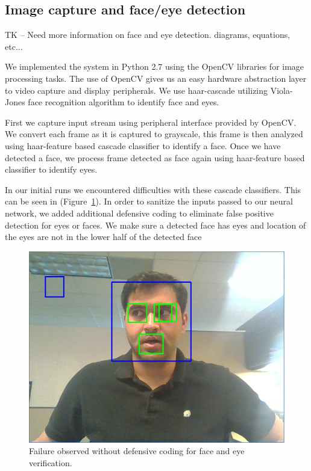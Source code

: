 \documentclass[10pt,twocolumn,letterpaper]{article}
\begin{document}
\subsection{Image capture and face/eye detection}
TK -- Need more information on face and eye detection. diagrams,
equations, etc...

We implemented the system in Python 2.7 using the OpenCV libraries for 
image processing tasks. The use of OpenCV gives us an easy hardware 
abstraction layer to video capture and display peripherals. We use 
haar-cascade utilizing Viola-Jones face recognition algorithm to 
identify face and eyes. 

First we capture input stream using peripheral
interface provided by OpenCV. We convert each 
frame as it is captured to grayscale, this frame is then analyzed 
using haar-feature based cascade classifier to identify a face. 
Once we have detected a face, we process frame detected 
as face again using haar-feature based classifier to identify eyes. 

In our initial runs we encountered difficulties with these cascade classifiers.
This can be seen in  (Figure~\ref{fig:defensive}).
In order to sanitize the inputs passed to our neural network, we added 
additional defensive coding to eliminate false positive detection 
for eyes or faces. We make sure a detected face has eyes 
and location of the eyes are not in the lower half of the detected face

\begin{figure}
  \begin{center}
    \includegraphics[width=\linewidth]{defensive_coding_example}
  \end{center}
  \caption{Failure observed without defensive coding for face and eye
    verification.}
  \label{fig:defensive}
\end{figure}
\end{document}
